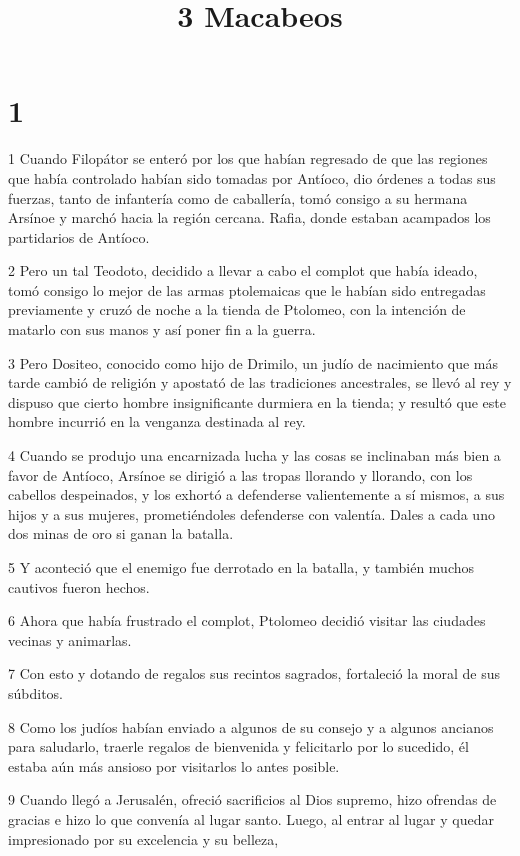 

\title{3 Macabeos}


\chapter{1}

\par 1 Cuando Filopátor se enteró por los que habían regresado de que las regiones que había controlado habían sido tomadas por Antíoco, dio órdenes a todas sus fuerzas, tanto de infantería como de caballería, tomó consigo a su hermana Arsínoe y marchó hacia la región cercana. Rafia, donde estaban acampados los partidarios de Antíoco.
\par 2 Pero un tal Teodoto, decidido a llevar a cabo el complot que había ideado, tomó consigo lo mejor de las armas ptolemaicas que le habían sido entregadas previamente y cruzó de noche a la tienda de Ptolomeo, con la intención de matarlo con sus manos y así poner fin a la guerra.
\par 3 Pero Dositeo, conocido como hijo de Drimilo, un judío de nacimiento que más tarde cambió de religión y apostató de las tradiciones ancestrales, se llevó al rey y dispuso que cierto hombre insignificante durmiera en la tienda; y resultó que este hombre incurrió en la venganza destinada al rey.
\par 4 Cuando se produjo una encarnizada lucha y las cosas se inclinaban más bien a favor de Antíoco, Arsínoe se dirigió a las tropas llorando y llorando, con los cabellos despeinados, y los exhortó a defenderse valientemente a sí mismos, a sus hijos y a sus mujeres, prometiéndoles defenderse con valentía. Dales a cada uno dos minas de oro si ganan la batalla.
\par 5 Y aconteció que el enemigo fue derrotado en la batalla, y también muchos cautivos fueron hechos.
\par 6 Ahora que había frustrado el complot, Ptolomeo decidió visitar las ciudades vecinas y animarlas.
\par 7 Con esto y dotando de regalos sus recintos sagrados, fortaleció la moral de sus súbditos.
\par 8 Como los judíos habían enviado a algunos de su consejo y a algunos ancianos para saludarlo, traerle regalos de bienvenida y felicitarlo por lo sucedido, él estaba aún más ansioso por visitarlos lo antes posible.
\par 9 Cuando llegó a Jerusalén, ofreció sacrificios al Dios supremo, hizo ofrendas de gracias e hizo lo que convenía al lugar santo. Luego, al entrar al lugar y quedar impresionado por su excelencia y su belleza,

